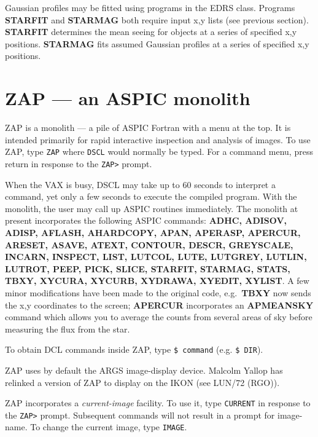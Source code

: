 Gaussian profiles may be fitted using programs in the EDRS class.
Programs {\bf STARFIT} and {\bf STARMAG} both require input x,y lists
(see previous section).
{\bf STARFIT} determines the mean seeing for objects at a series of specified
x,y positions.
{\bf STARMAG} fits assumed Gaussian profiles at a series of specified x,y
positions.

\section {ZAP --- an ASPIC monolith}

ZAP is a monolith --- a pile of ASPIC Fortran with a menu at the top.
It is intended primarily for rapid interactive inspection and analysis of
images.
To use ZAP, type {\tt ZAP} where {\tt DSCL}
would normally be typed.
For a command menu, press return in response to the {\tt ZAP>} prompt.

When the VAX is busy, DSCL may take up to 60 seconds to interpret a command,
yet only a few seconds to execute the compiled program.
With the monolith, the user may call up ASPIC routines immediately.
The monolith at present incorporates the following ASPIC commands:
{\bf ADHC, ADISOV, ADISP, AFLASH, AHARDCOPY, APAN, APERASP, APERCUR, ARESET,
ASAVE, ATEXT, CONTOUR, DESCR, GREYSCALE, INCARN, INSPECT, LIST, LUTCOL, LUTE,
LUTGREY, LUTLIN, LUTROT, PEEP, PICK, SLICE, STARFIT, STARMAG, STATS, TBXY,
XYCURA, XYCURB, XYDRAWA, XYEDIT, XYLIST}.
A few minor modifications have been made to the original code, e.g.\
{\bf TBXY} now sends the x,y coordinates to the screen; {\bf APERCUR}
incorporates an {\bf APMEANSKY} command which allows you to average the counts
from several areas of sky before measuring the flux from the star.

To obtain DCL commands inside ZAP, type {\tt \$ command} (e.g. {\tt \$ DIR}).

ZAP uses by default the ARGS image-display device.
Malcolm Yallop has relinked a version of ZAP to display on the IKON (see
LUN/72 (RGO)).

ZAP incorporates a {\em current-image} facility.
To use it, type {\tt CURRENT} in response to the {\tt ZAP>} prompt.
Subsequent commands will not result in a prompt for image-name.
To change the current image, type {\tt IMAGE}.

